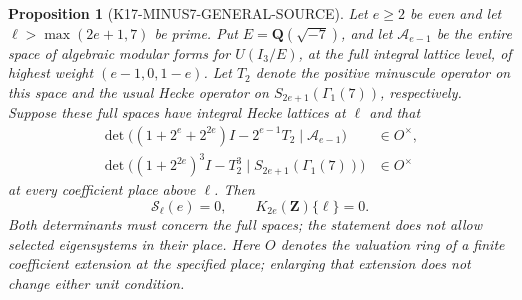 \documentclass[11pt,a4paper]{article}
\newtheorem{proposition}[theorem]{Proposition}
\theoremstyle{definition}
\begin{document}
\begin{proposition}[K17-MINUS7-GENERAL-SOURCE]
\label{prop:minus7-general-source}
Let $e\geq2$ be even and let $\ell>\max(2e+1,7)$ be prime.
Put $E=\mathbf Q(\sqrt{-7})$, and let $\mathcal A_{e-1}$ be the
entire space of algebraic modular forms for $U(I_3/E)$, at the full
integral lattice level, of highest weight $(e-1,0,1-e)$.
Let $T_2$ denote the positive minuscule operator on this space and
the usual Hecke operator on $S_{2e+1}(\Gamma_1(7))$, respectively.
Suppose these full spaces have integral Hecke lattices at $\ell$
and that
\[
 \begin{split}
 \det\bigl((1+2^e+2^{2e})I-2^{e-1}T_2
                         \mid\mathcal A_{e-1}\bigr)&\in O^\times,\\
 \det\bigl((1+2^{2e})^3I-T_2^3
                         \mid S_{2e+1}(\Gamma_1(7))\bigr)&\in O^\times
 \end{split}
 \tag{GS7.1}
\]
at every coefficient place above $\ell$. Then
\[
             \mathcal S_\ell(e)=0,
             \qquad K_{2e}(\mathbf Z)\{\ell\}=0.
 \tag{GS7.2}
\]
Both determinants must concern the full spaces; the statement does
not allow selected eigensystems in their place.
Here $O$ denotes the valuation ring of a finite coefficient
extension at the specified place; enlarging that extension does
not change either unit condition.
\end{proposition}
\end{document}
